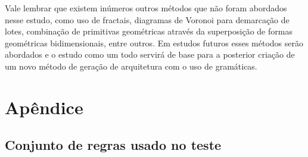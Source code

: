 \documentclass[a4paper, 11pt]{article}
\begin{document}
    Vale lembrar que existem inúmeros outros métodos que não foram abordados nesse estudo, como uso de fractais, diagramas de Voronoi para demarcação de lotes, combinação de primitivas geométricas através da superposição de formas geométricas bidimensionais, entre outros. Em estudos futuros esses métodos serão abordados e o estudo como um todo servirá de base para a posterior criação de um novo método de geração de arquitetura com o uso de gramáticas.

    
    \newpage
    
    
    

    \section{Apêndice} \label{sec:apendix}
        \subsection{Conjunto de regras usado no teste}
\end{document}
